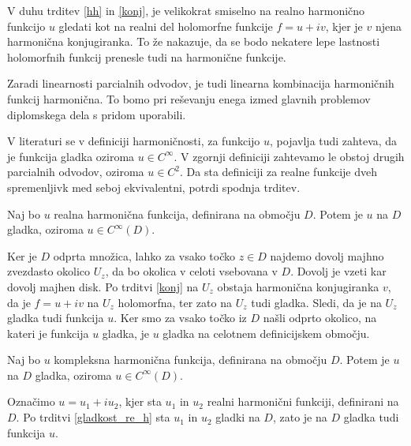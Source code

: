 \documentclass[mat1, tisk]{fmfdelo}
\begin{document}
    \begin{opomba}
        V duhu trditev \ref{hh} in \ref{konj}, je velikokrat smiselno na realno harmonično funkcijo $u$ gledati kot na realni del holomorfne funkcije $f = u + iv$, kjer je $v$ njena harmonična konjugiranka. To že nakazuje, da se bodo nekatere lepe lastnosti holomorfnih funkcij prenesle tudi na harmonične funkcije.
    \end{opomba}
    \begin{opomba}
        \label{lin}
        Zaradi linearnosti parcialnih odvodov, je tudi linearna kombinacija harmoničnih funkcij harmonična. To bomo pri reševanju enega izmed glavnih problemov diplomskega dela s pridom uporabili.
    \end{opomba}
    \begin{opomba}
        V literaturi se v definiciji harmoničnosti, za funkcijo $u$, pojavlja tudi zahteva, da je funkcija gladka oziroma $u \in C^{\infty}$. V zgornji definiciji zahtevamo le obstoj drugih parcialnih odvodov, oziroma $u \in C^2$. 
        Da sta definiciji za realne funkcije dveh spremenljivk med seboj ekvivalentni, potrdi spodnja trditev. 
    \end{opomba}
    \begin{trditev}
        \label{gladkost_re_h}
        Naj bo $u$ realna harmonična funkcija, definirana na območju $D$. Potem je $u$ na $D$ gladka, oziroma $u \in C^{\infty}(D)$. 
    \end{trditev}
    \begin{dokaz}
        Ker je  $D$ odprta množica, lahko za vsako točko $z \in D$ najdemo dovolj majhno zvezdasto okolico $U_z$, da bo okolica v celoti vsebovana v $D$. Dovolj je vzeti kar dovolj majhen disk. 
        Po trditvi \ref{konj} na $U_z$ obstaja harmonična konjugiranka $v$, da je $f = u+ iv$ na $U_z$ holomorfna, ter zato na $U_z$ tudi gladka. Sledi, da je na $U_z$ gladka tudi funkcija $u$.
        Ker smo za vsako točko iz $D$ našli odprto okolico, na kateri je funkcija $u$ gladka, je $u$ gladka na celotnem definicijskem območju.
    \end{dokaz}
    \begin{posledica}
        \label{gladkost_komp_h}
        Naj bo $u$ kompleksna harmonična funkcija, definirana na območju $D$. Potem je $u$ na $D$ gladka, oziroma $u \in C^{\infty}(D)$. 
    \end{posledica}
    \begin{dokaz}
        Označimo $u = u_1 + i u_2$, kjer sta $u_1$ in $u_2$ realni harmonični funkciji, definirani na $D$. Po trditvi \ref{gladkost_re_h} sta $u_1$ in $u_2$ gladki na $D$, zato je na $D$ gladka tudi funkcija $u$.
    \end{dokaz}
\end{document}
